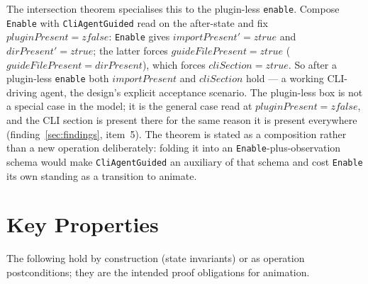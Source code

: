 \documentclass[a4paper,10pt,fleqn]{article}
\begin{document}
The intersection theorem specialises this to the plugin-less \texttt{enable}.
Compose \texttt{Enable} with \texttt{CliAgentGuided} read on the after-state and
fix $pluginPresent = zfalse$: \texttt{Enable} gives $importPresent' = ztrue$ and
$dirPresent' = ztrue$; the latter forces $guideFilePresent = ztrue$
($guideFilePresent = dirPresent$), which forces $cliSection = ztrue$. So after a
plugin-less \texttt{enable} both $importPresent$ and $cliSection$ hold --- a
working CLI-driving agent, the design's explicit acceptance scenario. The
plugin-less box is not a special case in the model; it is the general case read
at $pluginPresent = zfalse$, and the CLI section is present there for the same
reason it is present everywhere (finding~\ref{sec:findings}, item~5). The theorem
is stated as a composition rather than a new operation deliberately: folding it
into an \texttt{Enable}-plus-observation schema would make \texttt{CliAgentGuided}
an auxiliary of that schema and cost \texttt{Enable} its own standing as a
transition to animate.

\section{Key Properties}

The following hold by construction (state invariants) or as operation
postconditions; they are the intended proof obligations for animation.
\end{document}
